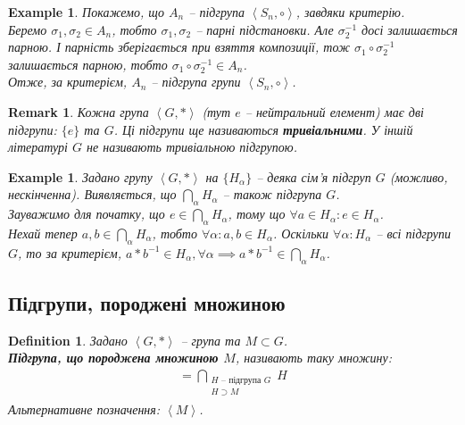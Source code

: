 \documentclass[a4paper, 10pt]{article}
\theoremstyle{theoremdd}
\theoremstyle{theoremdd}
\newtheorem{definition}[theorem]{Definition}
\theoremstyle{theoremdd}
\theoremstyle{theoremdd}
\theoremstyle{theoremdd}
\newtheorem{example}[theorem]{Example}
\theoremstyle{theoremdd}
\theoremstyle{theoremdd}
\theoremstyle{theoremdd}
\theoremstyle{theoremdd}
\theoremstyle{theoremdd}
\theoremstyle{theoremdd}
\newtheorem{remark}[theorem]{Remark}
\theoremstyle{theoremdd}
\theoremstyle{theoremdd}
\theoremstyle{theoremdd}
\theoremstyle{theoremdd}
\begin{document}
\begin{example}
Покажемо, що $A_n$ -- підгрупа $\left< S_n, \circ \right>$, завдяки критерію.\\
Беремо $\sigma_1, \sigma_2 \in A_n$, тобто $\sigma_1, \sigma_2$ -- парні підстановки. Але $\sigma_2^{-1}$ досі залишається парною. І парність зберігається при взяття композиції, тож $\sigma_1 \circ \sigma_2^{-1}$ залишається парною, тобто $\sigma_1 \circ \sigma_2^{-1} \in A_n$.\\
Отже, за критерієм, $A_n$ -- підгрупа групи $\left<S_n, \circ \right>$.
\end{example}

\begin{remark}
Кожна група $\left<G, *\right>$ (тут $e$ -- нейтральний елемент) має дві підгрупи: $\{e\}$ та $G$. Ці підгрупи ще називаються \textbf{тривіальними}. У іншій літературі $G$ не називають тривіальною підгрупою.
\end{remark}

\begin{example}
\label{intersection_of_subgroups_is_a_subgroup}
Задано групу $\left< G,*\right>$ на $\{H_\alpha\}$ -- деяка сім'я підгруп $G$ (можливо, нескінченна). Виявляється, що $\displaystyle\bigcap_{\alpha} H_\alpha$ -- також підгрупа $G$.\\
Зауважимо для початку, що $e \in \displaystyle\bigcap_{\alpha} H_\alpha$, тому що $\forall a \in H_\alpha: e \in H_\alpha$.\\
Нехай тепер $a,b \in \displaystyle\bigcap_{\alpha} H_\alpha$, тобто $\forall \alpha: a,b \in H_\alpha$. Оскільки $\forall \alpha: H_\alpha$ -- всі підгрупи $G$, то за критерієм, $a*b^{-1} \in H_\alpha, \forall \alpha \implies a*b^{-1} \in \displaystyle\bigcap_{\alpha} H_\alpha$.\\
\end{example}

\subsection{Підгрупи, породжені множиною}
\begin{definition}
Задано $\left< G, *\right>$ -- група та $M \subset G$.\\
\textbf{Підгрупа, що породжена множиною $M$}, називають таку множину:
\begin{align*}
[M] = \bigcap_{\substack{H \text{ -- підгрупа }G \\ H \supset M}} H
\end{align*}
Альтернативне позначення: $\left< M \right>$.
\end{definition}
\end{document}
